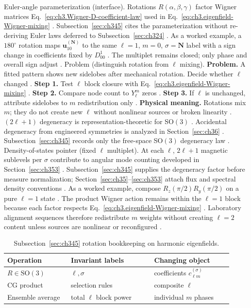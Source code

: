 Euler-angle parameterization (interface). Rotations \(R(\alpha,\beta,\gamma)\) factor Wigner matrices Eq.~\eqref{eq:ch3.Wigner-D-coefficient-law} used in
Eq.~\eqref{eq:ch3.eigenfield-Wigner-mixing} \cite{jackson1999}. Subsection~\ref{sec:ch345} cites the
parameterization without re-deriving Euler laws deferred to Subsection~\ref{sec:ch324} \cite{hansen1988}.
As a worked example, a \(180^{\circ}\) rotation maps \(\mathbf{u}_{10}^{(\mathbf{N})}\) to the same \(\ell=1\), \(m=0\), \(\sigma=\mathbf{N}\)
label with a sign change in coefficients fixed by \(D_{00}^{1}\) \cite{jackson1999}. The multiplet remains
closed; only phase and overall sign adjust \cite{hansen1988}.
Problem (distinguish rotation from \(\ell\) mixing). \textbf{Problem.} A fitted pattern shows new sidelobes after mechanical rotation. Decide whether \(\ell\) changed
\cite{harrington2001}.
\textbf{Step 1.} Test \(\ell\) block closure with Eq.~\eqref{eq:ch3.eigenfield-Wigner-mixing} \cite{hansen1988}.
\textbf{Step 2.} Compare node count to \(Y_{\ell}^{m}\) zeros \cite{jackson1999}.
\textbf{Step 3.} If \(\ell\) is unchanged, attribute sidelobes to \(m\) redistribution only \cite{stratton1941}.
\textbf{Physical meaning.} Rotations mix \(m\); they do not create new \(\ell\) without nonlinear sources or broken
linearity \cite{harrington2001}.
\((2\ell+1)\) degeneracy is representation-theoretic for SO\((3)\) \cite{jackson1999}. Accidental degeneracy
from engineered symmetries is analyzed in Section~\ref{sec:ch36} \cite{stratton1941}. Subsection~\ref{sec:ch345}
records only the free-space SO\((3)\) degeneracy law \cite{hansen1988}.
Density-of-states pointer (fixed \(\ell\) multiplet). At each \(\ell\), \(2\ell+1\) magnetic sublevels per \(\sigma\) contribute to angular mode counting developed in
Section~\ref{sec:ch353} \cite{stratton1941}. Subsection~\ref{sec:ch345} supplies the degeneracy factor
before measure normalization; Section~\ref{sec:ch35}--\ref{sec:ch353} attach flux and spectral density conventions
\cite{poynting1884}.
As a worked example, compose \(R_{z}(\pi/2)R_{y}(\pi/2)\) on a pure \(\ell=1\) state \cite{jackson1999}. The product Wigner
action remains within the \(\ell=1\) block because each factor respects Eq.~\eqref{eq:ch3.eigenfield-Wigner-mixing}
\cite{hansen1988}. Laboratory alignment sequences therefore redistribute \(m\) weights without creating
\(\ell=2\) content unless sources are nonlinear or reconfigured \cite{harrington2001}.
\begin{table}[t]
\centering
\caption{Subsection~\ref{sec:ch345} rotation bookkeeping on harmonic eigenfields.}
\label{tab:ch3.345-rotation-bookkeeping}
\small
\begin{tabular}{@{}p{0.26\linewidth}p{0.34\linewidth}p{0.32\linewidth}@{}}
\toprule
Operation & Invariant labels & Changing object \\
\midrule
\(R\in\mathrm{SO}(3)\) & \(\ell,\sigma\) & coefficients \(c_{\ell m}^{(\sigma)}\) \\
CG product & selection rules & composite \(\ell\) \\
Ensemble average & total \(\ell\) block power & individual \(m\) phases \\
\bottomrule
\end{tabular}
\end{table}
